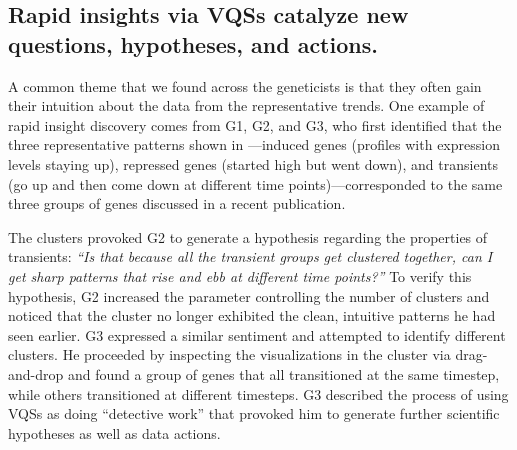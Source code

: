 \subsection{Rapid insights via VQSs catalyze new questions, hypotheses, and actions.}
\par {}
\par A common theme that we found across the geneticists is that they often gain their intuition about the data from the representative trends. One example of rapid insight discovery comes from G1, G2, and G3, who first identified that the three representative patterns shown in \zv---induced genes (profiles with expression levels staying up), repressed genes (started high but went down), and transients (go up and then come down at different time points)---corresponded to the same three groups of genes discussed in a recent publication\cite{Gloss2017}.
\par The clusters provoked G2 to generate a hypothesis regarding the properties of transients: \textit{``Is that because all the transient groups get clustered together, can I get sharp patterns that rise and ebb at different time points?''} To verify this hypothesis, G2 increased the parameter controlling the number of clusters and noticed that the cluster no longer exhibited the clean, intuitive patterns he had seen earlier. G3 expressed a similar sentiment and attempted to identify different clusters. He proceeded by inspecting the visualizations in the cluster via drag-and-drop and found a group of genes that all transitioned at the same timestep, while others transitioned at different timesteps. G3 described the process of using VQSs as doing ``detective work'' that provoked him to generate further scientific hypotheses as well as data actions.
